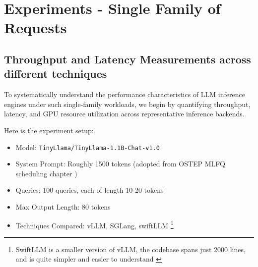 \chapter{Experiments - Single Family of Requests}
\label{ch:single_family_experiments}
\section{Throughput and Latency Measurements across different techniques}
To systematically understand the performance characteristics of LLM inference engines under such single-family workloads, we begin by quantifying throughput, latency, and GPU resource utilization across representative inference backends.

Here is the experiment setup:
\begin{itemize}
    \item Model: \texttt{TinyLlama/TinyLlama-1.1B-Chat-v1.0}
    \item System Prompt: Roughly 1500 tokens (adopted from OSTEP MLFQ scheduling chapter \cite{ArpaciDusseau23-Book})
    \item Queries: 100 queries, each of length 10-20 tokens
    \item Max Output Length: 80 tokens
    \item Techniques Compared: vLLM, SGLang, swiftLLM \footnote{SwiftLLM is a smaller version of vLLM, the codebase spans just 2000 lines, and is quite simpler and easier to understand \cite{swiftllm}}
\end{itemize}


